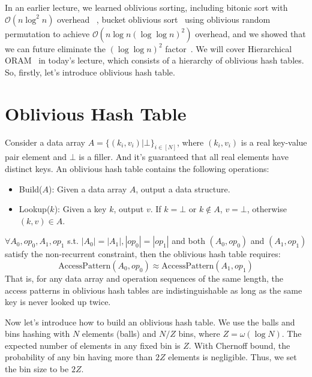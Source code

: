 \newcommand{\rsmpl}{\xleftarrow{\$}}

\newcommand{\alg}{\textsc{Alg}}

\newcommand{\ap}{\textsc{AccessPattern}}
\newtheorem{nonexample}[theorem]{Non-Example}


In an earlier lecture, we learned oblivious sorting, including bitonic sort with $\mathcal{O}(n \log^2 n)$ overhead~\cite{Batcher} , bucket oblivious sort~\cite{bucket} using oblivious random permutation to achieve $\mathcal{O}(n \log n (\log \log n)^2)$ overhead, 
and we showed that we can future eliminate the $(\log \log n)^2$ factor~\cite{domulticore, tianyao-sort}.
We will cover Hierarchical ORAM~\cite{10.1145/233551.233553} in today's lecture, which consists of a hierarchy of oblivious hash tables.
So, firstly, let's introduce oblivious hash table.

\section{Oblivious Hash Table}

\begin{definition}
    Consider a data array $A = \{ (k_i, v_i) | \bot \}_{i \in [N]}$, where $(k_i, v_i)$ is a real key-value pair element and $\bot$ is a filler. And it's guaranteed that all real elements have distinct keys. An oblivious hash table contains the following operations:
    \begin{itemize}
      \item Build($A$): Given a data array $A$, output a data structure.
      \item Lookup($k$): Given a key $k$, output $v$. If $k = \bot$ or $k \notin A$, $v = \bot$, otherwise $(k, v) \in A$.
    \end{itemize}
    $\forall A_0, op_0, A_1, op_1$ s.t. $|A_0| = |A_1|, |op_0| = |op_1|$ and both $(A_0, op_0)$ and $(A_1, op_1)$ satisfy the non-recurrent constraint, then the oblivious hash table requires: 
    $$\text{AccessPattern}(A_0, op_0) \approx \text{AccessPattern}(A_1, op_1)$$
    That is, for any data array and operation sequences of the same length, the access patterns in oblivious hash tables are indistinguishable as long as the same key is never looked up twice.
\end{definition}

Now let's introduce how to build an oblivious hash table.
We use the balls and bins hashing with $N$ elements (balls) and $N / Z$ bins, where $Z=\omega(\log N)$.
The expected number of elements in any fixed bin is $Z$. 
With Chernoff bound, the probability of any bin having more than $2Z$ elements is negligible.
Thus, we set the bin size to be $2Z$.

